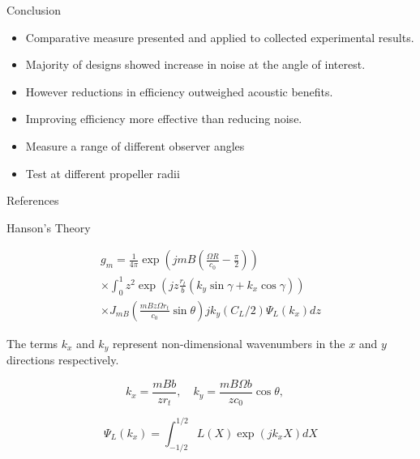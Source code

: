 \documentclass{beamer}
\begin{document}
\begin{frame}{Conclusion}
    \begin{itemize}
        \item<1->Comparative measure presented and applied to collected experimental results.
        \item<2-> Majority of designs showed increase in noise at the angle of interest.
        \item<3-> However reductions in efficiency outweighed acoustic benefits.
        \item<4-> Improving efficiency more effective than reducing noise.
    \end{itemize}
    \vspace{1cm}
    \begin{itemize}
        \item<5-> Measure a range of different observer angles
        \item<6-> Test at different propeller radii
    \end{itemize}
    
\end{frame}


\begin{frame}[allowframebreaks]{References}
    \printbibliography
\end{frame}


\begin{frame}{Hanson's Theory \cite{hanson_theory}}
        
    \begin{equation}
        \begin{aligned}
            g_m = \frac{1}{4\pi} \exp\left(jmB \left( \frac{\Omega R}{c_0} - \frac{\pi}{2} \right)\right) \\
            \times \int_0^1 z^2 \exp \left(j z \frac{r_t}{b} \left(k_y \sin \gamma + k_x \cos \gamma\right) \right) \\
            \times J_{mB} \left( \frac{mB z \Omega r_t}{c_0} \sin \theta \right)
                jk_y (C_L / 2) \Psi_L(k_x) dz
        \end{aligned}
        \label{eq:hansons_result}
    \end{equation}

    The terms $k_x$ and $k_y$ represent non-dimensional wavenumbers in the $x$ and $y$ directions respectively.

    \begin{equation}
        k_x = \frac{mB b}{z r_t}, \quad
        k_y = \frac{mB\Omega b}{z c_0} \cos \theta, \quad
    \end{equation}

    \begin{equation}
        \Psi_L(k_x) = \int_{-1/2}^{1/2} L(X) \exp(jk_x X) dX
    \end{equation}
\end{frame}
\end{document}
